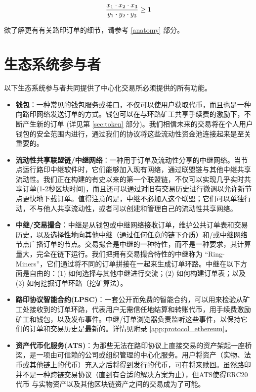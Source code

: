 \documentclass[UTF8]{ctexart}
\begin{document}
\begin{multicols}{2}
\begin{equation}
{{x_1 \cdot x_2 \cdot x_3 \over y_1 \cdot y_2 \cdot y_3} \geq 1}
\end{equation}


欲了解更有有关路印订单的细节，请参考 \ref{anatomy} 部分。 



\section{生态系统参与者\label{sec:ecosystem}}
以下生态系统参与者共同提供了中心化交易所必须提供的所有功能。 

\begin{itemize}

\item \textbf{钱包}：一种常见的钱包服务或接口，不仅可以使用户获取代币，而且也是一种向路印网络发送订单的方式。钱包可以在与环路矿工共享手续费的激励下，不断产生新的订单 (详见第 \ref{sec:token} 部分)。我们相信未来的交易将在个人用户钱包的安全范围内进行，通过我们的协议将这些流动性资金池连接起来是至关重要的。

\item \textbf{流动性共享联盟链/中继网络}：一种用于订单及流动性分享的中继网络。当节点运行路印中继软件时，它们能够加入现有网络，通过联盟链与其他中继共享流动性。我们正在构建的有史以来的第一个联盟链，不仅可以实现几乎实时共享订单(1-2秒区块时间)，而且还可以通过对旧有交易历史进行微调以允许新节点更快地下载订单。值得注意的是，中继不必加入这个联盟；它们可以单独行动，不与他人共享流动性，或者可以创建和管理自己的流动性共享网络。

\item \textbf{中继/交易撮合}：中继是从钱包或中继网络接收订单，维护公共订单表和交易历史，以及选择性地向其他中继（通过任何任意的链下介质）和/或中继网络节点广播订单的节点。交易撮合是中继的一种特性，而不是一种要求，其计算量大，完全在链下运行。我们把拥有交易撮合特性的中继称为 \enquote{Ring-Miners}，它们通过将不同的订单拼接在一起来生成订单环路。中继在以下方面是自由的：(1) 如何选择与其他中继进行交流；(2) 如何构建订单表；以及 (3) 如何挖掘订单环路（挖矿算法）。

\item \textbf{路印协议智能合约(LPSC)}：一套公开而免费的智能合约，可以用来检验从矿工处接收到的订单环路，代表用户无需信任地结算和转账代币，用手续费激励矿工和钱包，以及发布事件。中继/订单浏览器负责监听这些事件，以保持它们的订单和交易历史是最新的。详情见附录 \ref{app:protocol_ethereum}。 

\item \textbf{资产代币化服务(ATS)}：为那些无法在路印协议上直接交易的资产架起一座桥梁，是一项由可信赖的公司或组织管理的中心化服务。用户将资产（实物、法币或其他链上的代币）充入之后将得到发行的代币，可在将来赎回。虽然路印并不是一种跨链交易协议（直到有合适的解决方案为止），但ATS使得ERC20代币 \cite{ERC20} 与实物资产以及其他区块链资产之间的交易成为了可能。


\end{itemize}
\end{multicols}
\end{document}
